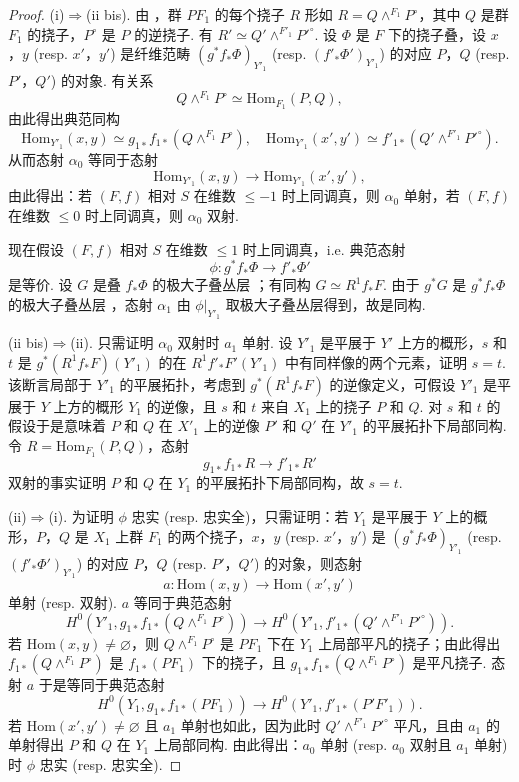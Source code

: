 \begin{proof}
(i)$\Rightarrow$(ii bis). 由 \cite[II 4.2.5]{exp13-1}，群 $P F_1$ 的每个挠子 $R$ 形如 $R = Q \wedge^{F_1} P^{\circ}$，其中 $Q$ 是群 $F_1$ 的挠子，$P^{\circ}$ 是 $P$ 的逆挠子. 有 $R' \simeq Q' \wedge^{F'_1} P'^{\circ}$. 设 $\Phi$ 是 $F$ 下的挠子叠，设 $x$，$y$ (resp. $x'$，$y'$) 是纤维范畴 $(g^{*} f_* \Phi)_{Y'_1}$ (resp. $(f'_* \Phi')_{Y'_1}$) 的对应 $P$，$Q$ (resp. $P'$，$Q'$) 的对象. 有关系
\[
Q \wedge^{F_1} P^{\circ} \simeq \mathrm{Hom}_{F_1}(P, Q),
\]
由此得出典范同构
\[
\mathrm{Hom}_{Y'_1}(x, y) \simeq g_{1*} f_{1*}(Q \wedge^{F_1} P^{\circ}), \quad \mathrm{Hom}_{Y'_1}(x', y') \simeq f'_{1*}(Q' \wedge^{F'_1} P'^{\circ}).
\]
从而态射 $\alpha_0$ 等同于态射
\[
\mathrm{Hom}_{Y'_1}(x, y) \longrightarrow \mathrm{Hom}_{Y'_1}(x', y'),
\]
由此得出：若 $(F, f)$ 相对 $S$ 在维数 $\leqslant -1$ 时上同调真，则 $\alpha_0$ 单射，若 $(F, f)$ 在维数 $\leqslant 0$ 时上同调真，则 $\alpha_0$ 双射.

现在假设 $(F, f)$ 相对 $S$ 在维数 $\leqslant 1$ 时上同调真，i.e. 典范态射
\[
\phi \colon g^{*} f_* \Phi \longrightarrow f'_* \Phi'
\]
是等价. 设 $G$ 是叠 $f_* \Phi$ 的极大子叠丛层 \cite[III 2.1.8]{exp13-1}；有同构 $G \simeq R^1 f_* F$. 由于 $g^{*} G$ 是 $g^{*} f_* \Phi$ 的极大子叠丛层 \cite[III 2.1.5.5]{exp13-2}，态射 $\alpha_1$ 由 $\phi|_{Y'_1}$ 取极大子叠丛层得到，故是同构.

(ii bis)$\Rightarrow$(ii). 只需证明 $\alpha_0$ 双射时 $a_1$ 单射. 设 $Y'_1$ 是平展于 $Y'$ 上方的概形，$s$ 和 $t$ 是 $g^{*}(R^1 f_* F)(Y'_1)$ 的在 $R^1 f'_* F'(Y'_1)$ 中有同样像的两个元素，证明 $s = t$. 该断言局部于 $Y'_1$ 的平展拓扑，考虑到 $g^{*}(R^1 f_* F)$ 的逆像定义，可假设 $Y'_1$ 是平展于 $Y$ 上方的概形 $Y_1$ 的逆像，且 $s$ 和 $t$ 来自 $X_1$ 上的挠子 $P$ 和 $Q$. 对 $s$ 和 $t$ 的假设于是意味着 $P$ 和 $Q$ 在 $X'_1$ 上的逆像 $P'$ 和 $Q'$ 在 $Y'_1$ 的平展拓扑下局部同构. 令 $R = \mathrm{Hom}_{F_1}(P, Q)$，态射
\[
g_{1*} f_{1*} R \longrightarrow f'_{1*} R'
\]
双射的事实证明 $P$ 和 $Q$ 在 $Y_1$ 的平展拓扑下局部同构，故 $s = t$.

(ii)$\Rightarrow$(i). 为证明 $\phi$ 忠实 (resp. 忠实全)，只需证明：若 $Y_1$ 是平展于 $Y$ 上的概形，$P$，$Q$ 是 $X_1$ 上群 $F_1$ 的两个挠子，$x$，$y$ (resp. $x'$，$y'$) 是 $(g^{*} f_* \Phi)_{Y'_1}$ (resp. $(f'_* \Phi')_{Y'_1}$) 的对应 $P$，$Q$ (resp. $P'$，$Q'$) 的对象，则态射
\[
a \colon \mathrm{Hom}(x, y) \longrightarrow \mathrm{Hom}(x', y')
\]
单射 (resp. 双射). $a$ 等同于典范态射
\[
H^0(Y'_1, g_{1*} f_{1*}(Q \wedge^{F_1} P^{\circ})) \longrightarrow H^0(Y'_1, f'_{1*}(Q' \wedge^{F'_1} P'^{\circ})).
\]
若 $\mathrm{Hom}(x, y) \neq \varnothing$，则 $Q \wedge^{F_1} P^{\circ}$ 是 $P F_1$ 下在 $Y_1$ 上局部平凡的挠子；由此得出 $f_{1*}(Q \wedge^{F_1} P^{\circ})$ 是 $f_{1*}(P F_1)$ 下的挠子，且 $g_{1*} f_{1*}(Q \wedge^{F_1} P^{\circ})$ 是平凡挠子. 态射 $a$ 于是等同于典范态射
\[
H^0(Y_1, g_{1*} f_{1*}(P F_1)) \longrightarrow H^0(Y'_1, f'_{1*}(P' F'_1)).
\]
若 $\mathrm{Hom}(x', y') \neq \varnothing$ 且 $a_1$ 单射也如此，因为此时 $Q' \wedge^{F'_1} P'^{\circ}$ 平凡，且由 $a_1$ 的单射得出 $P$ 和 $Q$ 在 $Y_1$ 上局部同构. 由此得出：$a_0$ 单射 (resp. $a_0$ 双射且 $a_1$ 单射) 时 $\phi$ 忠实 (resp. 忠实全).


\end{proof}
